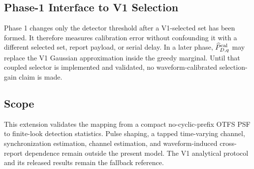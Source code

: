 \subsection{Phase-1 Interface to V1 Selection}

Phase 1 changes only the detector threshold after a V1-selected set has been
formed.  It therefore measures calibration error without confounding it with a
different selected set, report payload, or serial delay.  In a later phase,
$\widehat P_{D,q}^{\rm cal}$ may replace the V1 Gaussian approximation inside
the greedy marginal.  Until that coupled selector is implemented and validated,
no waveform-calibrated selection-gain claim is made.

\subsection{Scope}

This extension validates the mapping from a compact no-cyclic-prefix OTFS PSF
to finite-look detection statistics.  Pulse shaping, a tapped time-varying
channel, synchronization estimation, channel estimation, and waveform-induced
cross-report dependence remain outside the present model.  The V1 analytical
protocol and its released results remain the fallback reference.

